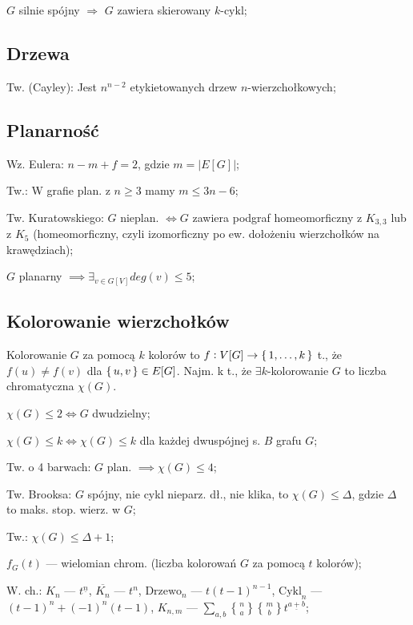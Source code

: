 \entry
$G$ silnie spójny $\Rightarrow$ $G$ zawiera skierowany $k\text{-cykl}$;

\subsection{Drzewa}

\entry
Tw. (Cayley): Jest $n^{n-2}$ etykietowanych drzew $n$-wierzchołkowych;

\subsection{Planarność}

\entry
Wz. Eulera: $n - m + f = 2$, gdzie $m = |E[G]|$;

\entry
Tw.: W grafie plan. z $n \geq 3$ mamy $m \leq 3n -6$;

\entry
Tw. Kuratowskiego: $G$ nieplan. $\iff G$ zawiera podgraf homeomorficzny
  z $K_{3,3}$ lub z $K_5$ (homeomorficzny, czyli
  izomorficzny po ew. dołożeniu wierzchołków na krawędziach);

\entry
$G$ planarny $\implies \exists_{v \in G[V]} deg(v) \leq 5$;

\subsection{Kolorowanie wierzchołków}

\entry
Kolorowanie $G$ za pomocą $k$ kolorów to
  $f: V[G] \rightarrow \set{1, \dots, k}$ t., że $f(u) \neq f(v)$ dla
  $\set{u, v} \in E[G]$. Najm. k t., że $\exists k$-kolorowanie $G$ to liczba
  chromatyczna $\chi (G)$.

\entry
$\chi(G) \leq 2 \Leftrightarrow G$ dwudzielny;

\entry
$\chi(G) \leq k \Leftrightarrow \chi(G) \leq k$ dla każdej dwuspójnej s. $B$
  grafu $G$;

\entry
Tw. o 4 barwach: $G$ plan. $\implies\chi(G)\leq 4$;

\entry
Tw. Brooksa: $G$ spójny, nie cykl nieparz. dł., nie klika, to
  $\chi(G) \leq \Delta$, gdzie $\Delta$ to maks. stop. wierz. w $G$;

\entry
Tw.: $\chi(G) \leq \Delta + 1$;

\entry
$f_G(t)$ --- wielomian chrom. (liczba kolorowań $G$ za pomocą $t$ kolorów);

\entry
W. ch.:
\entry
$K_n$ --- $t^{\underline{n}}$,
\entry
$\overline{K_n}$ --- $t^n$,
\entry
$\text{Drzewo}_n$ --- $t(t-1)^{n-1}$,
\entry
$\text{Cykl}_n$ --- $(t-1)^n + (-1)^n(t-1)$,
\entry
$K_{n,m}$ --- $\sum_{a,b}{n \brace a}{m \brace b}t^{\underline{a+b}}$;


